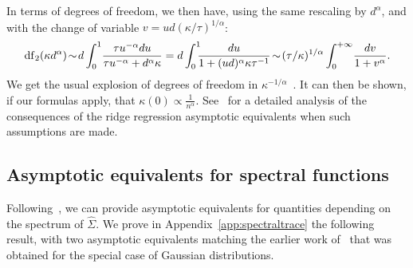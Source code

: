 \documentclass[11pt]{article}
\def \hS{ \widehat{ \Sigma} }
\begin{document}
 In terms of degrees of freedom, we then have, using the same rescaling by $d^\alpha$, and with the change of variable $v=ud(\kappa/\tau)^{1/\alpha}$:
 $$
 {\rm df}_2(\kappa d^\alpha)
 \! \sim \! d \int_0^1\! \frac{ \tau u^{-\alpha}du}{ \tau u^{-\alpha} + d^\alpha \kappa}
 =  d \int_0^1 \!\!\!\frac{  du}{ 1   + (ud)^\alpha \kappa \tau^{-1}}
\! \sim  \!  (\tau/\kappa)^{1/\alpha} \int_0^{+\infty}  \!\frac{  dv}{ 1 + v^\alpha}.
 $$
We get the usual explosion of degrees of freedom in $\kappa^{-1/\alpha}$~\cite{FCM:Caponetto+Vito:2007}.
 It can then be shown, if our formulas apply, that $\kappa(0) \propto \frac{1}{n^\alpha}$. 
See~\cite{cui2021generalization} for a detailed analysis of the consequences of the ridge regression asymptotic equivalents when such assumptions are made.
 
 
\subsection{Asymptotic equivalents for spectral functions} 
\label{sec:spectrace}
Following~\cite{ledoit2011eigenvectors,dobriban2018high}, we 
can provide asymptotic equivalents for quantities depending on the spectrum of $\hS$. We prove in Appendix~\ref{app:spectraltrace} the following result, with two asymptotic equivalents matching the earlier work of~\cite[Lemma 10] {dar2021common} that was obtained for the special case of Gaussian distributions.
\end{document}
